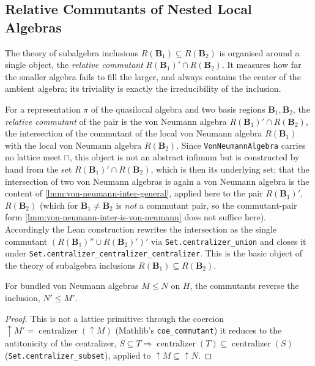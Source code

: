 \subsection{Relative Commutants of Nested Local Algebras}

The theory of subalgebra inclusions $R(\mathbf{B}_1) \subseteq R(\mathbf{B}_2)$ is organised around a single object, the \emph{relative commutant} $R(\mathbf{B}_1)' \cap R(\mathbf{B}_2)$. It measures how far the smaller algebra fails to fill the larger, and always contains the center of the ambient algebra; its triviality is exactly the irreducibility of the inclusion.

\begin{definition}
    \label{def:relative-commutant}
    \leanok
    For a representation $\pi$ of the quasilocal algebra and two basis regions $\mathbf{B}_1, \mathbf{B}_2$, the \emph{relative commutant} of the pair is the von Neumann algebra $R(\mathbf{B}_1)' \cap R(\mathbf{B}_2)$, the intersection of the commutant of the local von Neumann algebra $R(\mathbf{B}_1)$ with the local von Neumann algebra $R(\mathbf{B}_2)$. Since \texttt{VonNeumannAlgebra} carries no lattice meet $\sqcap$, this object is not an abstract infimum but is constructed by hand from the set $R(\mathbf{B}_1)' \cap R(\mathbf{B}_2)$, which is then its underlying set; that the intersection of two von Neumann algebras is again a von Neumann algebra is the content of \ref{lmm:von-neumann-inter-general}, applied here to the pair $R(\mathbf{B}_1)'$, $R(\mathbf{B}_2)$ (which for $\mathbf{B}_1 \neq \mathbf{B}_2$ is \emph{not} a commutant pair, so the commutant-pair form \ref{lmm:von-neumann-inter-is-von-neumann} does not suffice here). Accordingly the Lean construction rewrites the intersection as the single commutant $(R(\mathbf{B}_1)'' \cup R(\mathbf{B}_2)')'$ via \texttt{Set.centralizer\_union} and closes it under \texttt{Set.centralizer\_centralizer\_centralizer}. This is the basic object of the theory of subalgebra inclusions $R(\mathbf{B}_1) \subseteq R(\mathbf{B}_2)$.
\end{definition}

\begin{theorem}
    \label{thrm:commutant-antitone}
    \leanok
    For bundled von Neumann algebras $M \le N$ on $H$, the commutants reverse the inclusion, $N' \le M'$.
\end{theorem}
\begin{proof}
    \leanok
    This is not a lattice primitive: through the coercion $\uparrow M' = \operatorname{centralizer}(\uparrow M)$ (Mathlib's \texttt{coe\_commutant}) it reduces to the antitonicity of the centralizer, $S \subseteq T \Rightarrow \operatorname{centralizer}(T) \subseteq \operatorname{centralizer}(S)$ (\texttt{Set.centralizer\_subset}), applied to $\uparrow M \subseteq \uparrow N$.
\end{proof}

